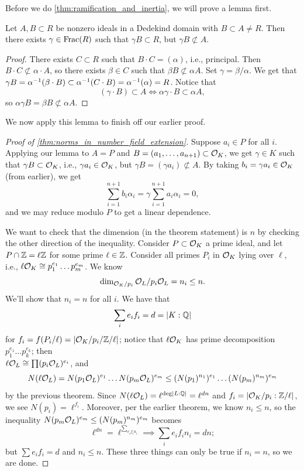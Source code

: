 Before we do \ref{thm:ramification_and_inertia}, we will prove a lemma first.
\begin{lemma} \label{lem:shift_ideal_out_of_inclusion}
    Let $A, B \subset R$ be nonzero ideals in a Dedekind domain with $B \subset A \neq R$. Then there exists $\gamma \in \operatorname{Frac}(R)$ such that $\gamma B \subset R$, but $\gamma B \not\subset A$.
\end{lemma}
\begin{proof}
    There exists $C \subset R$ such that $B \cdot C = (\alpha)$, i.e., principal. Then $B \cdot C \not\subset \alpha \cdot A$, so there exists $\beta \in C$ such that $\beta B \not\subset \alpha A$. Set $\gamma = \beta/\alpha$. We get that $\gamma B = \alpha^{-1} (\beta \cdot B) \subset \alpha^{-1} (C \cdot B) = \alpha^{-1} (\alpha) = R$. Notice that
    \[ (\gamma \cdot B) \subset A \iff \alpha \gamma \cdot B \subset \alpha A, \]
    so $\alpha \gamma B = \beta B \not\subset \alpha A$.
\end{proof}
We now apply this lemma to finish off our earlier proof.

\begin{proof}[Proof of \ref{thm:norms_in_number_field_extension}]
    Suppose $a_i \in P$ for all $i$. Applying our lemma to $A = P$ and $B = (a_1, \dots, a_{n+1}) \subset \mathcal O_K$, we get $\gamma \in K$ such that $\gamma B \subset \mathcal O_K$, i.e., $\gamma a_i \in \mathcal O_K$, but $\gamma B = (\gamma a_i) \not\subset A$. By taking $b_i = \gamma a_i \in \mathcal O_K$ (from earlier), we get
    \[ \sum_{i=1}^{n+1} b_i \alpha_i = \gamma \sum_{i=1}^{n+1} a_i \alpha_i = 0, \]
    and we may reduce modulo $P$ to get a linear dependence.
    
    \newpage
    We want to check that the dimension (in the theorem statement) is $n$ by checking the other direction of the inequality. Consider $P \subset \mathcal O_K$ a prime ideal, and let $P \cap \mathbb Z = \ell \mathbb Z$ for some prime $\ell \in \mathbb Z$. Consider all primes $P_i$ in $\mathcal O_K$ lying over $\ell$, i.e., $\ell \mathcal O_K \cong p_1^{e_1} \dots p_m^{e_m}$. We know
    \[ \dim_{\mathcal O_K / p_i} \mathcal O_L/p_i \mathcal O_L = n_i \leq n. \]
    We'll show that $n_i = n$ for all $i$. We have that
    \[ \sum_i e_i f_i = d = \left\lvert K : \mathbb Q \right\rvert \]
    for $f_i = f(P_i / \ell) = \left\lvert \mathcal O_K / p_i / \mathbb Z/\ell \right\rvert$; notice that $\ell \mathcal O_K$ has prime decomposition $p_1^{e_1} \dots p_k^{e_k}$; then \\ $\ell \mathcal O_L \cong \prod (p_i \mathcal O_L)^{e_i}$, and
    \[ N(\ell \mathcal O_L) = N(p_1 \mathcal O_L)^{e_1} \dots N(p_m \mathcal O_L)^{e_m} \leq (N(p_1)^{n_1})^{e_1} \dots (N(p_m)^{n_m})^{e_m} \]
    by the previous theorem. Since $N(\ell \mathcal O_L) = \ell^{\deg \left\lvert L : \mathbb Q \right\rvert} = \ell^{dn}$ and $f_i = \left\lvert \mathcal O_K/p_i : \mathbb Z/\ell \right\rvert$, we see $N(p_i) = \ell^{f_i}$. Moreover, per the earlier theorem, we know $n_i \leq n$, so the inequality $N(p_m \mathcal O_L)^{e_m} \leq (N(p_m)^{n_m})^{e_m}$ becomes
    \[ \ell^{dn} = \ell^{\sum_{e_i f_i n_i}} \implies \sum_i e_i f_i n_i = dn; \]
    but $\sum e_i f_i = d$ and $n_i \leq n$. These three things can only be true if $n_i = n$, so we are done.
\end{proof}

